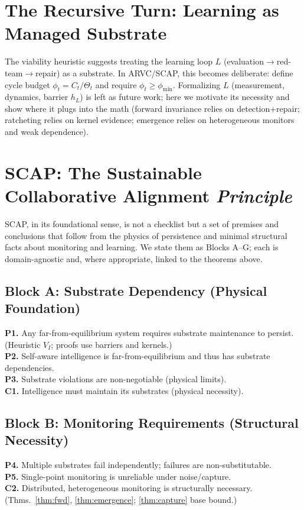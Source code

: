 \documentclass[11pt]{article}
\theoremstyle{definition}
\begin{document}
\section{The Recursive Turn: Learning as Managed Substrate}
The viability heuristic suggests treating the learning loop $L$ (evaluation$\to$red-team$\to$repair) as a substrate. In ARVC/SCAP, this becomes deliberate: define cycle budget $\phi_t=C_t/\Theta_t$ and require $\phi_t\ge \phi_{\min}$. Formalizing $L$ (measurement, dynamics, barrier $h_L$) is left as future work; here we motivate its necessity and show where it plugs into the math (forward invariance relies on detection+repair; ratcheting relies on kernel evidence; emergence relies on heterogeneous monitors and weak dependence).

\section{SCAP: The Sustainable Collaborative Alignment \emph{Principle}}
\label{sec:scap_foundational}
SCAP, in its foundational sense, is not a checklist but a set of premises and conclusions that follow from the physics of persistence and minimal structural facts about monitoring and learning. We state them as Blocks A--G; each is domain-agnostic and, where appropriate, linked to the theorems above.

\subsection*{Block A: Substrate Dependency (Physical Foundation)}
\textbf{P1.} Any far-from-equilibrium system requires substrate maintenance to persist. (Heuristic $V_I$; proofs use barriers and kernels.) \\
\textbf{P2.} Self-aware intelligence is far-from-equilibrium and thus has substrate dependencies. \\
\textbf{P3.} Substrate violations are non-negotiable (physical limits). \\
\textbf{C1.} Intelligence must maintain its substrates (physical necessity).

\subsection*{Block B: Monitoring Requirements (Structural Necessity)}
\textbf{P4.} Multiple substrates fail independently; failures are non-substitutable. \\
\textbf{P5.} Single-point monitoring is unreliable under noise/capture. \\
\textbf{C2.} Distributed, heterogeneous monitoring is structurally necessary. (Thms.~\ref{thm:fwd}, \ref{thm:emergence}; \ref{thm:capture} base bound.)
\end{document}
